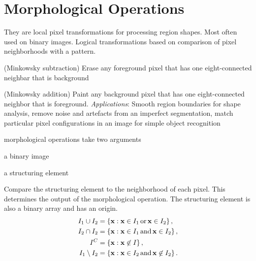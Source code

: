\section{Morphological Operations}
They are local pixel transformations for processing region shapes. Most often used on binary images. Logical transformations based on comparison of pixel neighborhoods with a pattern.
\begin{compactdesc}
\item[\lp{8-neighbor erode}] (Minkowsky subtraction) Erase any foreground pixel that has one eight-connected neighbar that is background
\item[\lp{8-neighbor dilate}] (Minkowsky addition) Paint any background pixel that has one eight-connected neighbor that is foreground. \emph{Applications}: Smooth region boundaries for shape analysis, remove noise and artefacts from an imperfect segmentation, match particular pixel configurations in an image for simple object recognition
	\item[\lp{structuring elements}] morphological operations take two arguments\\
		\begin{enumerate*}[label=\protect\circled{\arabic*},itemjoin=]
			\item a binary image\\
			\item a structuring element\\
		\end{enumerate*}
	Compare the structuring element to the neighborhood of each pixel. This determines the output of the morphological operation. The structuring element is also a binary array and has an origin.
	\begin{align*}
		I_1\cup I_2&=\left\{ \bm{\mathrm{x}}:\bm{\mathrm{x}}\in I_1\,\text{or}\,\bm{\mathrm{x}}\in I_2 \right\},\\
		I_2\cap I_2&=\left\{ \bm{\mathrm{x}}:\bm{\mathrm{x}}\in I_1\,\text{and}\,\bm{\mathrm{x}}\in I_2 \right\},\\
		I^{C}&=\left\{ \bm{\mathrm{x}}:\bm{\mathrm{x}}\not\in I \right\},\\
		I_1\setminus I_2&=\left\{ \bm{\mathrm{x}}:\bm{\mathrm{x}}\in I_2\,\text{and}\,\bm{\mathrm{x}}\not\in I_2 \right\}.
	\end{align*}

\end{compactdesc}

